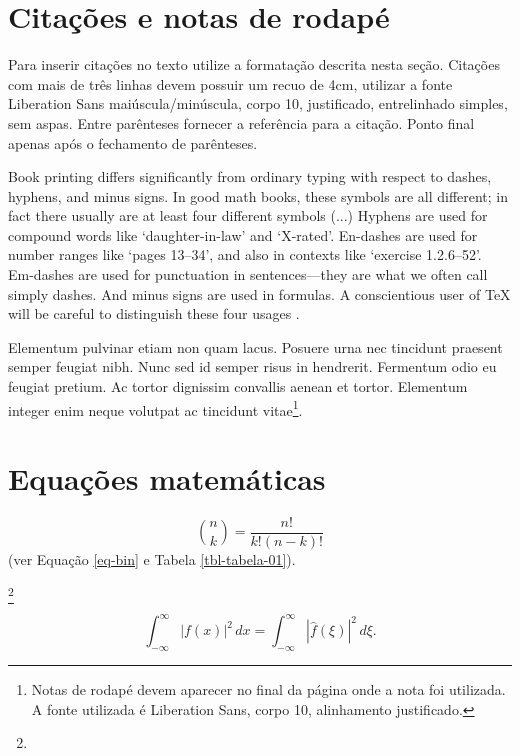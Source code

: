 \documentclass[red]{textolivre}
\begin{document}
\lipsum[3]

\section{Citações e notas de rodapé}
Para inserir citações no texto utilize a formatação descrita nesta seção. 
Citações com mais de três linhas devem possuir um recuo de 4cm, utilizar a fonte 
Liberation Sans maiúscula\slash{}minúscula, corpo 10, justificado, entrelinhado simples, sem aspas. 
Entre parênteses fornecer a referência para a citação.  Ponto final apenas após o fechamento de parênteses. 

\begin{quoting}
Book printing differs significantly from ordinary typing with respect to dashes, hyphens, and minus signs.
In good math books, these symbols are all different; in fact there usually are at least four different symbols (...)
Hyphens are used for compound words like `daughter-in-law' and `X-rated'. En-dashes are used for number ranges like 
`pages 13--34', and also in contexts like `exercise 1.2.6--52'. 
Em-dashes are used for punctuation in sentences---they are what we often call simply dashes. 
And minus signs are used in formulas. A conscientious user of \TeX{} will be careful to distinguish these four usages 
\cite[p. 4]{donaldknuth1984}.
\end{quoting}

Elementum pulvinar etiam non quam lacus. Posuere urna nec tincidunt praesent semper feugiat nibh. 
Nunc sed id semper risus in hendrerit. Fermentum odio eu feugiat pretium. 
Ac tortor dignissim convallis aenean et tortor. 
Elementum integer enim neque volutpat ac tincidunt vitae\footnote{
Notas de rodapé devem aparecer no final da página onde a nota foi utilizada. A fonte utilizada é  Liberation Sans, corpo 10, alinhamento justificado.
}.


\section{Equações matemáticas}
\lipsum[13-14]
\begin{equation}\label{eq-bin}
\binom{n}{k} = \frac{n!}{k!(n-k)!}
\end{equation}
\lipsum[15] (ver Equação \ref{eq-bin} e Tabela \ref{tbl-tabela-01}).

\lipsum[3-5]\footnote{\lipsum[30]}

\begin{equation}\label{eq-plancherel}
\int_{-\infty}^\infty \left| f(x) \right|^2\,dx = \int_{-\infty}^\infty \left| \hat{f}(\xi) \right|^2\,d\xi.
\end{equation}
\end{document}
